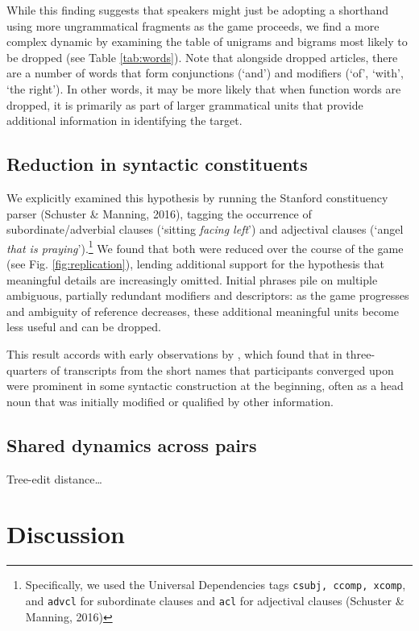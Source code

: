 While this finding suggests that speakers might just be adopting a
shorthand using more ungrammatical fragments as the game proceeds, we
find a more complex dynamic by examining the table of unigrams and
bigrams most likely to be dropped (see Table \ref{tab:words}). Note that
alongside dropped articles, there are a number of words that form
conjunctions (`and') and modifiers (`of', `with', `the right'). In other
words, it may be more likely that when function words are dropped, it is
primarily as part of larger grammatical units that provide additional
information in identifying the target.

\subsection{Reduction in syntactic constituents}
We explicitly examined this hypothesis by running the Stanford
constituency parser (Schuster \& Manning, 2016), tagging the occurrence
of subordinate/adverbial clauses (`sitting \emph{facing left}') and
adjectival clauses (`angel \emph{that is praying}').\footnote{Specifically,
  we used the Universal Dependencies tags \texttt{csubj, ccomp, xcomp},
  and \texttt{advcl} for subordinate clauses and \texttt{acl} for
  adjectival clauses (Schuster \& Manning, 2016)} We found that both
were reduced over the course of the game (see Fig.
\ref{fig:replication}), lending additional support for the hypothesis
that meaningful details are increasingly omitted. Initial phrases pile
on multiple ambiguous, partially redundant modifiers and descriptors: as
the game progresses and ambiguity of reference decreases, these
additional meaningful units become less useful and can be dropped.

This result accords with early observations by \cite{Carroll80_NamingHedges}, which found that in three-quarters of transcripts from \cite{KraussWeinheimer64_ReferencePhrases} the short names that participants converged upon were prominent in some syntactic construction at the beginning, often as a head noun that was initially modified or qualified by other information. 

\subsection{Shared dynamics across pairs}

Tree-edit distance\dots


\section{Discussion}\label{general-discussion}

